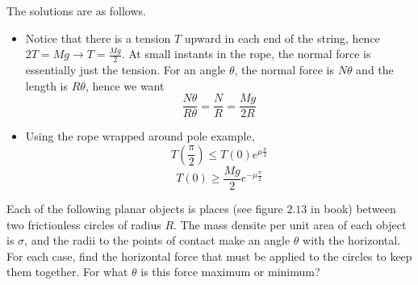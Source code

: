 \documentclass[11pt]{scrartcl}
\begin{document}
\begin{soln}
  The solutions are as follows.
  \begin{itemize}
    \item Notice that there is a tension $T$ upward in each end of the string,
      hence $2T=Mg\to T=\frac{Mg}{2}$. At small instants in the rope, the normal
      force is essentially just the tension. For an angle $\theta$, the normal
      force is $N\theta$ and the length is $R\theta$, hence we want
      $$\frac{N\theta}{R\theta}=\frac{N}{R}=\frac{Mg}{2R}$$
    \item Using the rope wrapped around pole example,
      $$T(\frac{\pi}{2})\le T(0)e^{\mu\frac{\pi}{2}}$$
      $$T(0)\ge \frac{Mg}{2}e^{-\mu\frac{\pi}{2}}$$
  \end{itemize}
\end{soln}
\begin{example}
  Each of the following planar objects is places (see figure $2.13$ in book)
  between two frictionless circles of radius $R$. The mass densite per unit area
  of each object is $\sigma$, and the radii to the points of contact make an
  angle $\theta$ with the horizontal. For each case, find the horizontal
  force that must be applied to the circles to keep them together. For
  what $\theta$ is this force maximum or minimum?
\end{example}
\end{document}
